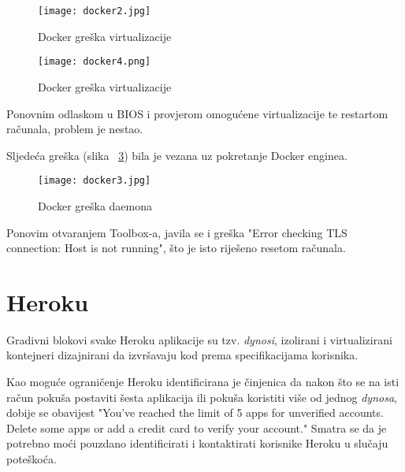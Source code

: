 \begin{figure}[!htb]
	\centering
	\texttt{[image: docker2.jpg]}
	\caption{Docker greška virtualizacije}
	\label{fig:docker2}
\end{figure}

\begin{figure}[!htb]
	\centering
	\texttt{[image: docker4.png]}
	\caption{Docker greška virtualizacije}
	\label{fig:docker4}
\end{figure}

Ponovnim odlaskom u BIOS i provjerom omogućene virtualizacije te restartom računala, problem je nestao.

Sljedeća greška (slika ~\ref{fig:docker3}) bila je vezana uz pokretanje Docker enginea. 

\begin{figure}[!htb]
	\centering
	\texttt{[image: docker3.jpg]}
	\caption{Docker greška daemona}
	\label{fig:docker3}
\end{figure}

Ponovim otvaranjem Toolbox-a, javila se i greška "Error checking TLS connection: Host is not running", što je isto riješeno resetom računala.

\section{Heroku}
Gradivni blokovi svake Heroku aplikacije su tzv. \textit{dynosi}, izolirani i virtualizirani kontejneri dizajnirani da izvršavaju kod prema specifikacijama korisnika.\newline

Kao moguće ograničenje Heroku identificirana je činjenica da nakon što se na isti račun pokuša postaviti šesta aplikacija ili pokuša koristiti više od jednog \textit{dynosa}, dobije se obavijest "You've reached the limit of 5 apps for unverified accounts. Delete some apps or add a credit card to verify your account." \newline
Smatra se da je potrebno moći pouzdano identificirati i kontaktirati korisnike Heroku u slučaju poteškoća.

